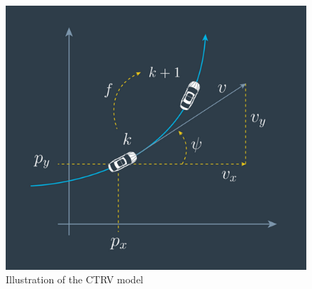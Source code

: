 \documentclass[12pt]{article}
\begin{document}
\begin{figure}[h]
	\center
	\includegraphics[scale=0.5]{./misc/CTRV_model.png}
	\caption{Illustration of the CTRV model}
	\label{fig:ctrv}
\end{figure}
\end{document}
